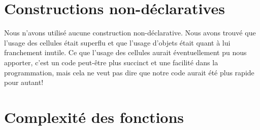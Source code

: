\documentclass[a4paper,12pt,oneside ]{article}
\begin{document}
\section{Constructions non-déclaratives}
Nous n'avons utilisé aucune construction non-déclarative. Nous avons trouvé que l'usage des cellules était superflu et que l'usage d'objets était quant à lui franchement inutile. Ce que l'usage des cellules aurait éventuellement pu nous apporter, c'est un code peut-être plus succinct et une facilité dans la programmation, mais cela ne veut pas dire que notre code aurait été plus rapide pour autant!

\section{Complexité des fonctions}
\end{document}

